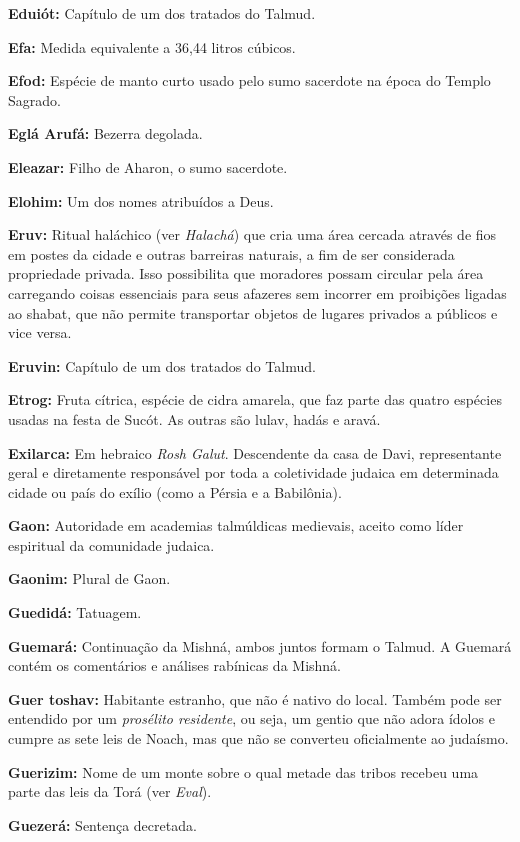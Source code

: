 \begin{hangparas}{.25in}{1}
{\textbf{Eduiót:} Capítulo de um dos tratados do Talmud.

\textbf{Efa:} Medida equivalente a 36,44 litros cúbicos.

\textbf{Efod:} Espécie de manto curto usado pelo sumo sacerdote na
época do Templo Sagrado.

\textbf{Eglá Arufá:} Bezerra degolada.

\textbf{Eleazar:} Filho de Aharon, o sumo sacerdote.

\textbf{Elohim:} Um dos nomes atribuídos a Deus.

\textbf{Eruv:} Ritual haláchico (ver \emph{Halachá}) que cria uma área cercada 
através de fios em postes da cidade e outras barreiras naturais, a fim de ser 
considerada propriedade privada. Isso possibilita que moradores possam circular 
pela área carregando coisas essenciais para seus afazeres sem incorrer em 
proibições ligadas ao shabat, que não permite transportar objetos de lugares 
privados a públicos e vice versa.

\textbf{Eruvin:} Capítulo de um dos tratados do Talmud.

\textbf{Etrog:} Fruta cítrica, espécie de cidra amarela, que faz parte das 
quatro espécies usadas na festa de Sucót. As outras são lulav, hadás e aravá.

\textbf{Exilarca:} Em hebraico \emph{Rosh Galut}. Descendente da casa de Davi, 
representante geral e diretamente responsável por toda a coletividade
judaica em determinada cidade ou país do exílio (como a Pérsia e a Babilônia).

\textbf{Gaon:} Autoridade em academias talmúldicas medievais, aceito como líder espiritual da comunidade judaica.

\textbf{Gaonim:} Plural de Gaon.

\textbf{Guedidá:} Tatuagem.

\textbf{Guemará:} Continuação da Mishná, ambos juntos formam o Talmud. A Guemará 
contém os comentários e análises rabínicas da Mishná.

\textbf{Guer toshav:} Habitante estranho, que não é nativo do local. Também pode ser entendido por um \emph{prosélito residente}, ou seja, um gentio que não adora
ídolos e cumpre as sete leis de Noach, mas que não se converteu oficialmente ao judaísmo.

\textbf{Guerizim:} Nome de um monte sobre o qual metade das tribos recebeu uma 
parte das leis da Torá (ver \emph{Eval}).

\textbf{Guezerá:} Sentença decretada.

}
\end{hangparas}
